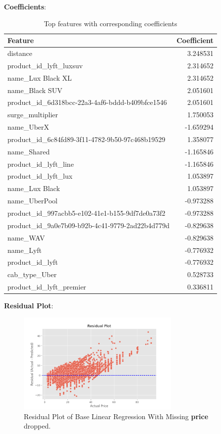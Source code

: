 \documentclass[a4paper,12pt]{article}
\begin{document}
\noindent\textbf{Coefficients}: 
\begin{table}[H]
    \centering
    \begin{tabular}{|l|r|}
    \hline
    \textbf{Feature} & \textbf{Coefficient} \\
    \hline
    distance & 3.248531 \\
    product\_id\_lyft\_luxsuv & 2.314652 \\
    name\_Lux Black XL & 2.314652 \\
    name\_Black SUV & 2.051601 \\
    product\_id\_6d318bcc-22a3-4af6-bddd-b409bfce1546 & 2.051601 \\
    surge\_multiplier & 1.750053 \\
    name\_UberX & -1.659294 \\
    product\_id\_6c84fd89-3f11-4782-9b50-97c468b19529 & 1.358077 \\
    name\_Shared & -1.165846 \\
    product\_id\_lyft\_line & -1.165846 \\
    product\_id\_lyft\_lux & 1.053897 \\
    name\_Lux Black & 1.053897 \\
    name\_UberPool & -0.973288 \\
    product\_id\_997acbb5-e102-41e1-b155-9df7de0a73f2 & -0.973288 \\
    product\_id\_9a0e7b09-b92b-4c41-9779-2ad22b4d779d & -0.829638 \\
    name\_WAV & -0.829638 \\
    name\_Lyft & -0.776932 \\
    product\_id\_lyft & -0.776932 \\
    cab\_type\_Uber & 0.528733 \\
    product\_id\_lyft\_premier & 0.336811 \\
    \hline
    \end{tabular}
    \caption{Top features with corresponding coefficients}
    \label{tab:tab_3}
\end{table}

\noindent\textbf{Residual Plot}: 
\begin{figure}[H]
    \centering
    \includegraphics[width=0.7\textwidth]{./images/residual_of_base_lr.png}
    \caption{Residual Plot of Base Linear Regression With Missing \textbf{price} dropped.}
    \label{fig:fig_1}
\end{figure}
\end{document}
